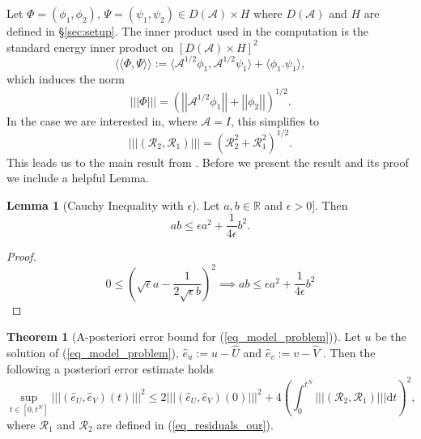 \documentclass[12pt,a4paper]{article}
\numberwithin{equation}{section}
\theoremstyle{definition}
\newcommand{\pnorm}[1]{\left|\left|\left|#1\right|\right|\right|}
\newcommand{\qp}[1]{\left(#1\right)}
\newcommand{\qb}[1]{\left[#1\right]}
\newcommand{\rec}[1]{\widehat{{#1}}}
\newcommand{\Normgs}[1]{\left|\left|#1\right|\right|}
\newtheorem{Thm}[subsection]{Theorem}
\newtheorem{Lemma}[subsection]{Lemma}
\begin{document}
Let $\Phi=\qp{\phi_1, \phi_2}$, $\Psi =\qp{\psi_1,\psi_2}\in D\qp{\mathcal{A}}\times H$ where $D\qp{\mathcal{A}}$ and $H$ are defined in \S \ref{sec:setup}.  The inner product used in the computation is the standard energy inner product on $\qb{D\qp{\mathcal{A}}\times H}^2$
\begin{equation}\label{defn_innerprod}
\langle\langle \Phi,\Psi \rangle\rangle:= \langle \mathcal{A}^{1/2}\phi_1, \mathcal{A}^{1/2}\psi_1  \rangle + \langle \phi_1. \psi_1  \rangle,
\end{equation}
which induces the norm
\begin{equation}
\pnorm{\Phi} = \qp{\Normgs{\mathcal{A}^{1/2}\phi_1} + \Normgs{\phi_2}}^{1/2}.
\end{equation}
In the case we are interested in, where $\mathcal{A}=I$,  this simplifies to
\begin{equation}
\left|\left|\left|\left(\mathcal{R}_2, \mathcal{R}_1\right)\right|\right|\right| = (\mathcal{R}_2^2 +\mathcal{R}_1^2)^{1/2}.
\end{equation}
This leads us to the main result from \cite[Thm 3.1]{georgoulis2016posteriori}.  Before we present the result and its proof we include a helpful Lemma.
\begin{Lemma}[Cauchy Inequality with $\epsilon$]
	Let $a,b \in \mathbb{R}$ and $\epsilon>0]$.  Then
	\begin{equation}\label{eq_cauchy_ineq_eps}
	ab\leq \epsilon a^2 +\frac{1}{4\epsilon}b^2.
	\end{equation}
\end{Lemma}
\begin{proof}
	\begin{equation*}
	0\leq \qp{\sqrt{\epsilon}a-\frac{1}{2\sqrt{\epsilon}b}}^2\implies ab\leq \epsilon a^2 +\frac{1}{4\epsilon}b^2
	\end{equation*}
\end{proof}
\begin{Thm}[A-posteriori error bound for (\ref{eq_model_problem})]\label{thm:bound}
Let $u$ be the solution of (\ref{eq_model_problem}), $\hat{e}_u:=u-\rec{U}$ and $\hat{e}_v:=v-\rec{V}$ .  Then the following a posteriori error estimate holds
\begin{equation}\label{eq_bound}
\sup_{t\in\qb{0,t^N}}\pnorm{\qp{\hat{e}_U,\hat{e}_V}\qp{t}}^2\leq
2\pnorm{\qp{\hat{e}_U,\hat{e}_V}\qp{0}}^2+
4\qp{\int_0^{t^N}\pnorm{\qp{\mathcal{R}_2,\mathcal{R}_1}}\mathrm{d}t}^2,
\end{equation}
where $\mathcal{R}_1$ and $\mathcal{R}_2$ are defined in (\ref{eq_residuals_our}).
\end{Thm}
\end{document}
